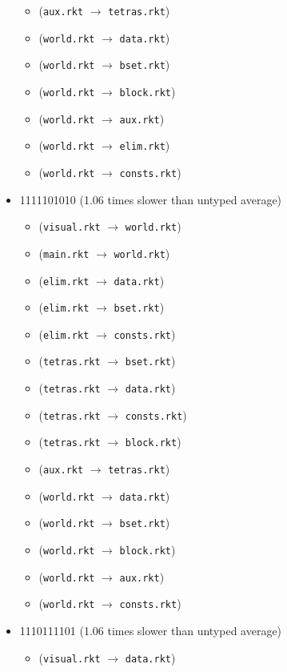 \documentclass{article}
\newcommand{\mono}[1]{\texttt{#1}}
\begin{document}
\begin{itemize}
\begin{itemize}
  \item (\mono{aux.rkt} $\rightarrow$ \mono{tetras.rkt})
  \item (\mono{world.rkt} $\rightarrow$ \mono{data.rkt})
  \item (\mono{world.rkt} $\rightarrow$ \mono{bset.rkt})
  \item (\mono{world.rkt} $\rightarrow$ \mono{block.rkt})
  \item (\mono{world.rkt} $\rightarrow$ \mono{aux.rkt})
  \item (\mono{world.rkt} $\rightarrow$ \mono{elim.rkt})
  \item (\mono{world.rkt} $\rightarrow$ \mono{consts.rkt})
  \end{itemize}
\item 1111101010 (1.06 times slower than untyped average)
  \begin{itemize}
  \item (\mono{visual.rkt} $\rightarrow$ \mono{world.rkt})
  \item (\mono{main.rkt} $\rightarrow$ \mono{world.rkt})
  \item (\mono{elim.rkt} $\rightarrow$ \mono{data.rkt})
  \item (\mono{elim.rkt} $\rightarrow$ \mono{bset.rkt})
  \item (\mono{elim.rkt} $\rightarrow$ \mono{consts.rkt})
  \item (\mono{tetras.rkt} $\rightarrow$ \mono{bset.rkt})
  \item (\mono{tetras.rkt} $\rightarrow$ \mono{data.rkt})
  \item (\mono{tetras.rkt} $\rightarrow$ \mono{consts.rkt})
  \item (\mono{tetras.rkt} $\rightarrow$ \mono{block.rkt})
  \item (\mono{aux.rkt} $\rightarrow$ \mono{tetras.rkt})
  \item (\mono{world.rkt} $\rightarrow$ \mono{data.rkt})
  \item (\mono{world.rkt} $\rightarrow$ \mono{bset.rkt})
  \item (\mono{world.rkt} $\rightarrow$ \mono{block.rkt})
  \item (\mono{world.rkt} $\rightarrow$ \mono{aux.rkt})
  \item (\mono{world.rkt} $\rightarrow$ \mono{consts.rkt})
  \end{itemize}
\item 1110111101 (1.06 times slower than untyped average)
  \begin{itemize}
  \item (\mono{visual.rkt} $\rightarrow$ \mono{data.rkt})

\end{itemize}
\end{itemize}
\end{document}
